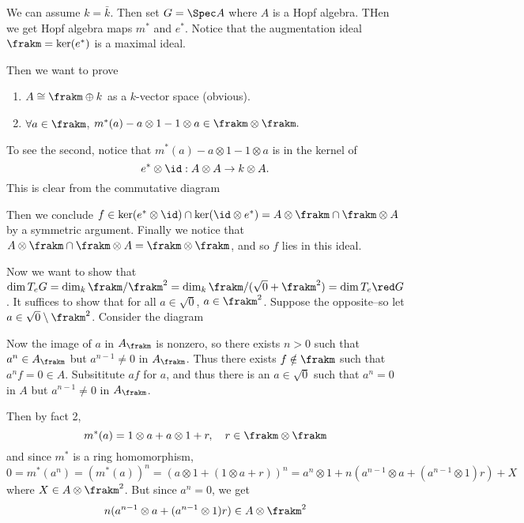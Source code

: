 \documentclass[12pt]{article}
\begin{document}
\begin{prf}
	We can assume $k=\bar k$. Then set $G=\Spec A$ where $A$ is a Hopf algebra. THen we get Hopf algebra maps $m^\ast$ and $e^\ast$.
	Notice that the augmentation ideal $\frakm=\ker(e^\ast)$ is a maximal ideal.

	Then we want to prove 
	\begin{enumerate}
		\item $A\cong\frakm\oplus k$ as a $k$-vector space (obvious).
		\item $\forall a\in\frakm$, $m^\ast(a)-a\otimes 1-1\otimes a\in \frakm\otimes \frakm.$
	\end{enumerate}
	To see the second, notice that $m^\ast(a)-a\otimes 1-1\otimes a$ is in the kernel of 
	\[e^\ast\otimes \id:A\otimes A\to k\otimes A.\]
	This is clear from the commutative diagram
	\begin{center}
	\end{center}
	Then we conclude $f\in \ker(e^\ast\otimes\id)\cap\ker(\id\otimes e^\ast)=A\otimes\frakm\cap\frakm\otimes A$ by a symmetric argument.
	Finally we notice that $A\otimes\frakm\cap\frakm\otimes A=\frakm\otimes\frakm$, and so $f$ lies in this ideal.

	Now we want to show that $\dim T_e G=\dim_k\frakm/\frakm^2=\dim_k\frakm/(\sqrt{0}+\frakm^2)=\dim T_e\red G$. It suffices to show that 
	for all $a\in\sqrt{0}$, $a\in \frakm^2$. Suppose the opposite--so let $a\in\sqrt{0}\setminus \frakm^2$. Consider the diagram 
	\begin{center}
	\end{center}
	Now the image of $a$ in $A_\frakm$ is nonzero, so there exists $n>0$ such that $a^n\in A_\frakm$ but $a^{n-1}\ne 0$ in $A_\frakm$.
	Thus there exists $f\notin \frakm$ such that $a^nf=0\in A$. Subsititute $af$ for $a$, and thus there is an $a\in\sqrt{0}$ such that $a^n=0$ in $A$ but $a^{n-1}\ne 0$ in $A_\frakm$.

	Then by fact 2,
	\[m^\ast(a)=1\otimes a+a\otimes 1+r,\quad r\in\frakm\otimes\frakm\]
	and since $m^\ast$ is a ring homomorphism, 
	\[0=m^\ast(a^n)=(m^\ast(a))^n=(a\otimes 1+(1\otimes a+r))^n=a^n\otimes 1+n(a^{n-1}\otimes a+(a^{n-1}\otimes 1)r)+X\]
	where $X\in A\otimes\frakm^2$. But since $a^n=0$, we get 
	\[n(a^{n-1}\otimes a+(a^{n-1}\otimes 1)r)\in A\otimes \frakm^2\]


\end{prf}
\end{document}
